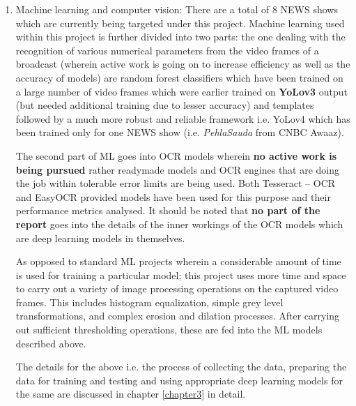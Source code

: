 \begin{enumerate}
  \item Machine learning and computer vision: There are a total of 8
    NEWS shows which are currently being targeted under this project.
    Machine learning used within this project is further divided into
    two parts: the one dealing with the recognition of various
    numerical parameters from the video frames of a broadcast
    (wherein active work is going on to increase efficiency as well
    as the accuracy of models) are random forest classifiers which
    have been trained on a large number of video frames which were
    earlier trained on \textbf{YoLov3} output (but needed additional
    training due to lesser accuracy) and templates followed by a much
    more robust and reliable framework i.e. YoLov4 which has been
    trained only for one NEWS show (i.e. \textit{PehlaSauda} from
    CNBC Awaaz). \par

    The second part of ML goes into OCR models wherein \textbf{no
    active work is being pursued} rather readymade models and OCR
    engines that are doing the job within tolerable error limits are
    being used. Both Tesseract – OCR and EasyOCR provided models have
    been used for this purpose and their performance metrics
    analysed. It should be noted that \textbf{no part of the report}
    goes into the details of the inner workings of the OCR models
    which are deep learning models in themselves. \par

    As opposed to standard ML projects wherein a considerable amount
    of time is used for training a particular model; this project
    uses more time and space to carry out a variety of image
    processing operations on the captured video frames. This includes
    histogram equalization, simple grey level transformations, and
    complex erosion and dilation processes. After carrying out
    sufficient thresholding operations, these are fed into the ML
    models described above. \par

    The details for the above i.e. the process of collecting the
    data, preparing the data for training and testing and using
    appropriate deep learning models for the same are discussed in
    chapter \ref{chapter3} in detail.


\end{enumerate}
